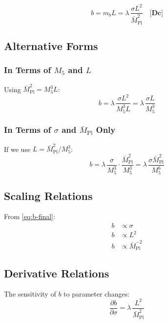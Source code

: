 \documentclass[11pt,a4paper]{article}
\newcommand{\Mpl}{\bar{M}_{\mathrm{Pl}}}
\newcommand{\Mfive}{M_5}
\newcommand{\mb}{m_b}
\newcommand{\tagDc}{\textbf{[Dc]}}
\theoremstyle{definition}
\theoremstyle{plain}
\theoremstyle{remark}
\begin{document}
\begin{equation}
\boxed{b = \mb L = \lambda \, \frac{\sigma L^2}{\Mpl^2} \quad \tagDc{}}
\label{eq:b-final}
\end{equation}

\subsection{Alternative Forms}

\subsubsection{In Terms of $\Mfive$ and $L$}

Using $\Mpl^2 = \Mfive^3 L$:
\begin{equation}
b = \lambda \, \frac{\sigma L^2}{\Mfive^3 L} = \lambda \, \frac{\sigma L}{\Mfive^3}
\label{eq:b-M5}
\end{equation}

\subsubsection{In Terms of $\sigma$ and $\Mpl$ Only}

If we use $L = \Mpl^2/\Mfive^3$:
\begin{equation}
b = \lambda \, \frac{\sigma}{\Mfive^3} \cdot \frac{\Mpl^2}{\Mfive^3} = \lambda \, \frac{\sigma \Mpl^2}{\Mfive^6}
\label{eq:b-M5-6}
\end{equation}

\subsection{Scaling Relations}

From \cref{eq:b-final}:
\begin{align}
b &\propto \sigma \label{eq:b-scale-sigma} \\
b &\propto L^2 \label{eq:b-scale-L} \\
b &\propto \Mpl^{-2} \label{eq:b-scale-Mpl}
\end{align}

\subsection{Derivative Relations}

The sensitivity of $b$ to parameter changes:
\begin{equation}
\frac{\partial b}{\partial \sigma} = \lambda \, \frac{L^2}{\Mpl^2}
\label{eq:db-dsigma}
\end{equation}
\end{document}
